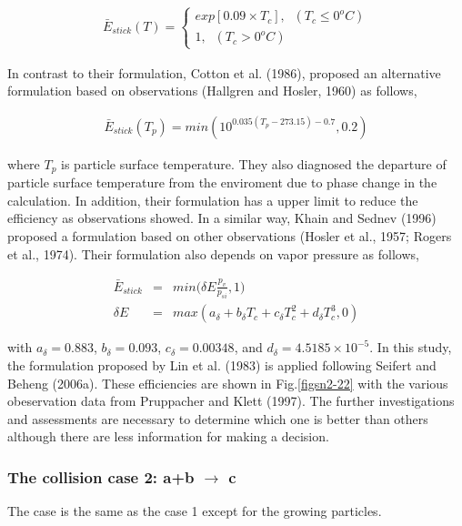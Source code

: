 \begin{eqnarray}
\bar{E}_{stick}(T)=
\left\{
\begin{array}{l}
exp[0.09\times T_{c}],\;\;(T_{c}\leq 0^{o}C) \\
1,\;\;(T_{c}> 0^{o}C) 
\label{sn185}
\end{array}
\right.
\end{eqnarray}

In contrast to their formulation, Cotton et al. (1986), proposed an alternative formulation based on observations (Hallgren and Hosler, 1960) as follows,

\begin{eqnarray}
\bar{E}_{stick}(T_{p})=min(10^{0.035(T_{p}-273.15)-0.7},0.2)\label{sn186}
\end{eqnarray}

where $T_{p}$ is particle surface temperature. They also diagnosed the departure of particle surface temperature from the enviroment due to phase change in the calculation. In addition, their formulation has a upper limit to reduce the efficiency as observations showed. In a similar way, Khain and Sednev (1996) proposed a formulation based on other observations (Hosler et al., 1957; Rogers et al., 1974). Their formulation also depends on vapor pressure as follows,

\begin{eqnarray}
\bar{E}_{stick}&=&min\bigl(\delta E\frac{p_{v}}{p_{si}},1\bigr)\label{sn187}\\
\delta E&=&max(a_{\delta}+b_{\delta}T_{c}+c_{\delta}T_{c}^{2}+d_{\delta}T_{c}^{3},0)\label{sn188}
\end{eqnarray}

with $a_{\delta} = 0.883$, $b_{\delta} = 0.093$, $c_{\delta} = 0.00348$, and $d_{\delta} = 4.5185 \times 10^{-5}$. In this study, the formulation proposed by Lin et al. (1983) is applied following Seifert and Beheng (2006a). These efficiencies are shown in Fig.\ref{figsn2-22} with the various obeservation data from Pruppacher and Klett (1997). The further investigations and assessments are necessary to determine which one is better than others although there are less information for making a decision.


\subsubsection{The collision case 2: a+b $\rightarrow$ c}
 The case is the same as the case 1 except for the growing particles. 


